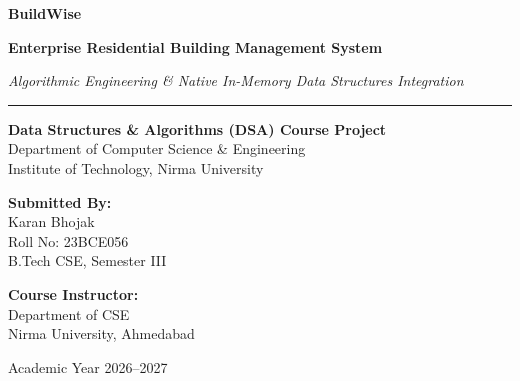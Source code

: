 \documentclass[12pt,a4paper]{article}
\begin{document}
\begin{titlepage}
    \centering
    \vspace*{1.2cm}
    
    {\Huge \bfseries \color{headerblue} BuildWise \par}
    \vspace{0.4cm}
    {\LARGE \textbf{Enterprise Residential Building Management System} \par}
    \vspace{0.2cm}
    {\large \textit{Algorithmic Engineering \& Native In-Memory Data Structures Integration} \par}
    
    \vspace{1.5cm}
    \rule{\linewidth}{1.2pt}
    \vspace{0.8cm}
    
    \textbf{\Large Data Structures \& Algorithms (DSA) Course Project} \\
    \vspace{0.3cm}
    {\large Department of Computer Science \& Engineering} \\
    {\large Institute of Technology, Nirma University}
    
    \vspace{2.5cm}
    
    \begin{minipage}{0.45\textwidth}
        \begin{flushleft} \large
            \textbf{Submitted By:} \\
            Karan Bhojak \\
            Roll No: 23BCE056 \\
            B.Tech CSE, Semester III
        \end{flushleft}
    \end{minipage}
    \hfill
    \begin{minipage}{0.45\textwidth}
        \begin{flushright} \large
            \textbf{Course Instructor:} \\
            Department of CSE \\
            Nirma University, Ahmedabad
        \end{flushright}
    \end{minipage}
    
    \vfill
    {\large Academic Year 2026--2027 \par}
\end{titlepage}
\end{document}
